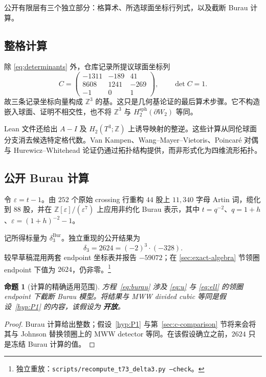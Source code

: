 \documentclass[11pt]{amsart}
\newtheorem{proposition}[theorem]{命题}
\theoremstyle{definition}
\theoremstyle{remark}
\newcommand{\Z}{\mathbb{Z}}
\newcommand{\Bur}{\mathrm{Bur}}
\newcommand{\Open}{\textbf{开放}}
\begin{document}
公开有限层有三个独立部分：格算术、所选球面坐标行列式，以及截断 Burau 计算。

\subsection{整格计算}

除 \eqref{eq:determinants} 外，仓库记录所提议球面坐标列
\begin{equation}\label{eq:spherecols}
C=\begin{pmatrix}
-1311&-189&41\\
8608&1241&-269\\
-1&0&1
\end{pmatrix},
\qquad \det C=1.
\end{equation}
故三条记录坐标向量构成 $\Z^3$ 的基。这只是几何基论证的最后算术步骤。它不构造嵌入球面、证明不相交性，也不将 $\Z^3$ 与 $H_2^{\mathrm{sph}}(\partial W_2)$ 等同。

Lean 文件还给出 $A-I$ 及 $H_2(T^3;\Z)$ 上诱导映射的整逆。这些计算从同伦球面分支消去候选特定格代数。Van Kampen、Wang--Mayer--Vietoris、Poincaré 对偶与 Hurewicz--Whitehead 论证仍通过拓扑结构提供，而非形式化为四维流形拓扑。

\subsection{公开 Burau 计算}

令 $\varepsilon=t-1$。由 $252$ 个原始 crossing 行重构 $44$ 股上 $11{,}340$ 字母 Artin 词，缆化到 $88$ 股，并在 $\Z[\varepsilon]/(\varepsilon^7)$ 上应用非约化 Burau 表示，其中 $t=q^{-2}$、$q=1+h$、$\varepsilon=(1+h)^{-2}-1$。

记所得标量为 $\delta_3^{\Bur}$。独立重现的公开结果为
\begin{equation}\label{eq:burau}
\delta_3=2624=(-2)^3\cdot(-328).
\end{equation}
较早草稿混用两套 endpoint 坐标表并报告 $-59072$；在 \ref{sec:exact-algebra} 节领圈 endpoint 下值为 $2624$，仍非零。\footnote{独立重放：\texttt{scripts/recompute\_t73\_delta3.py --check}。}

\begin{proposition}[计算的精确适用范围]\label{prop:scope}
方程~\eqref{eq:burau} 涉及 \eqref{eq:u} 与 \eqref{eq:ell} 的领圈 endpoint 下截断 Burau 模型。将结果与 MWW divided cubic 等同是假设~\ref{hyp:P1} 的内容，该假设为 \Open。
\end{proposition}

\begin{proof}
Burau 计算给出整数；假设~\ref{hyp:P1} 与第~\ref{sec:c-comparison} 节将来会将其与 Johnson 替换领圈上的 MWW detector 等同。在该假设确立之前，$2624$ 只是冻结 Burau 计算的值。
\end{proof}
\end{document}
